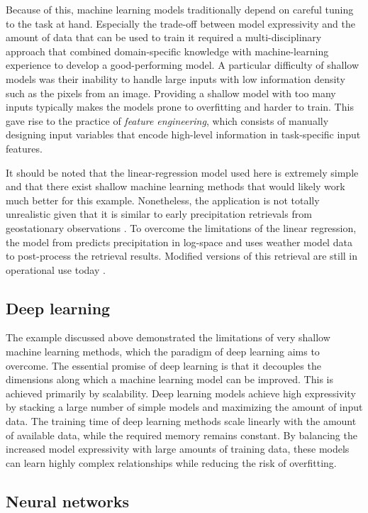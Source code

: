 Because of this, machine learning models traditionally depend on careful tuning
to the task at hand. Especially the trade-off between model expressivity and the
amount of data that can be used to train it required a multi-disciplinary
approach that combined domain-specific knowledge with machine-learning
experience to develop a good-performing model. A particular difficulty of
shallow models was their inability to handle large inputs with low information
density such as the pixels from an image. Providing a shallow model with too
many inputs typically makes the models prone to overfitting and harder to train.
This gave rise to the practice of \textit{feature engineering}, which consists
of manually designing input variables that encode high-level information in
task-specific input features.

It should be noted that the linear-regression model used here is extremely
simple and that there exist shallow machine learning methods that would likely
work much better for this example. Nonetheless, the application is not totally
unrealistic given that it is similar to early precipitation retrievals from
geostationary observations \citep{vicente98}. To overcome the limitations of the
linear regression, the model from \citet{vicente98} predicts precipitation in
log-space and uses weather model data to post-process the retrieval results.
Modified versions of this retrieval are still in operational use today
\citep{siqueira19}.

\subsection{Deep learning}

The example discussed above demonstrated the limitations of very shallow machine
learning methods, which the paradigm of deep learning aims to overcome. The
essential promise of deep learning is that it decouples the dimensions along
which a machine learning model can be improved. This is achieved primarily by
scalability. Deep learning models achieve high expressivity by stacking a large
number of simple models and maximizing the amount of input data. The training
time of deep learning methods scale linearly with the amount of available data,
while the required memory remains constant. By balancing the increased model
expressivity with large amounts of training data, these models can learn highly
complex relationships while reducing the risk of overfitting.

  \subsection{Neural networks}

